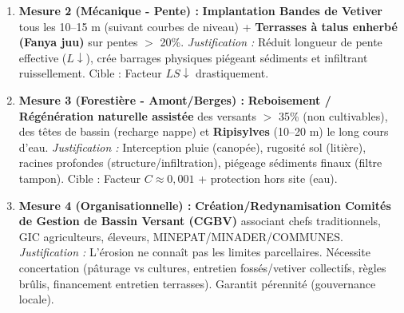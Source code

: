 \documentclass[11pt]{article}
\begin{document}
\begin{corrige}
\begin{enumerate}
\begin{enumerate}
            \textit{Justification :} Amortit \emph{splash} (couvert), maintient porosité (racines Mucuna), fixe N (légumineuse), fournit paillis saison sèche. Cible : Facteur $C$ (USLE) $\downarrow$ de 0,4 à $<$ 0,05.
        \item \textbf{Mesure 2 (Mécanique - Pente) :} \textbf{Implantation Bandes de Vetiver} tous les 10--15 m (suivant courbes de niveau) + \textbf{Terrasses à talus enherbé (Fanya juu)} sur pentes $>$ 20\%.
            \textit{Justification :} Réduit longueur de pente effective ($L \downarrow$), crée barrages physiques piégeant sédiments et infiltrant ruissellement. Cible : Facteur $LS \downarrow$ drastiquement.
        \item \textbf{Mesure 3 (Forestière - Amont/Berges) :} \textbf{Reboisement / Régénération naturelle assistée} des versants $>$ 35\% (non cultivables), des têtes de bassin (recharge nappe) et \textbf{Ripisylves} (10--20 m) le long cours d'eau.
            \textit{Justification :} Interception pluie (canopée), rugosité sol (litière), racines profondes (structure/infiltration), piégeage sédiments finaux (filtre tampon). Cible : Facteur $C \approx 0,001$ + protection hors site (eau).
        \item \textbf{Mesure 4 (Organisationnelle) :} \textbf{Création/Redynamisation Comités de Gestion de Bassin Versant (CGBV)} associant chefs traditionnels, GIC agriculteurs, éleveurs, MINEPAT/MINADER/COMMUNES.
            \textit{Justification :} L'érosion ne connaît pas les limites parcellaires. Nécessite concertation (pâturage vs cultures, entretien fossés/vetiver collectifs, règles brûlis, financement entretien terrasses). Garantit pérennité (gouvernance locale).
    \end{enumerate}
\end{enumerate}
\end{corrige}
\end{document}

